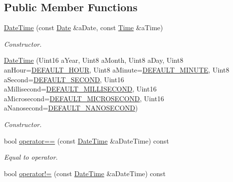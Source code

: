 \subsection*{Public Member Functions}
\begin{DoxyCompactItemize}
\item 
\hyperlink{classostk_1_1physics_1_1time_1_1_date_time_a974b5a7581ae7461ccf0e6ab85e42633}{Date\+Time} (const \hyperlink{classostk_1_1physics_1_1time_1_1_date}{Date} \&a\+Date, const \hyperlink{classostk_1_1physics_1_1time_1_1_time}{Time} \&a\+Time)
\begin{DoxyCompactList}\small\item\em Constructor. \end{DoxyCompactList}\item 
\hyperlink{classostk_1_1physics_1_1time_1_1_date_time_a85caea4e89f9d0436df65f1368f95738}{Date\+Time} (Uint16 a\+Year, Uint8 a\+Month, Uint8 a\+Day, Uint8 an\+Hour=\hyperlink{_date_time_8hpp_a29cf77aa34816fadd42d28e0076972d2}{D\+E\+F\+A\+U\+L\+T\+\_\+\+H\+O\+UR}, Uint8 a\+Minute=\hyperlink{_date_time_8hpp_a54870f99937ade8acd8a74e2162f6291}{D\+E\+F\+A\+U\+L\+T\+\_\+\+M\+I\+N\+U\+TE}, Uint8 a\+Second=\hyperlink{_date_time_8hpp_a6ac0fc9f50c93ddbea90f7ee16876c0a}{D\+E\+F\+A\+U\+L\+T\+\_\+\+S\+E\+C\+O\+ND}, Uint16 a\+Millisecond=\hyperlink{_date_time_8hpp_ac04ce019c94f46b059ce2c38a461b09c}{D\+E\+F\+A\+U\+L\+T\+\_\+\+M\+I\+L\+L\+I\+S\+E\+C\+O\+ND}, Uint16 a\+Microsecond=\hyperlink{_date_time_8hpp_ab098709ee4b926644c1c68216add901b}{D\+E\+F\+A\+U\+L\+T\+\_\+\+M\+I\+C\+R\+O\+S\+E\+C\+O\+ND}, Uint16 a\+Nanosecond=\hyperlink{_date_time_8hpp_a68609a8be8c5d286f17625e24a2e149a}{D\+E\+F\+A\+U\+L\+T\+\_\+\+N\+A\+N\+O\+S\+E\+C\+O\+ND})
\begin{DoxyCompactList}\small\item\em Constructor. \end{DoxyCompactList}\item 
bool \hyperlink{classostk_1_1physics_1_1time_1_1_date_time_a8ffda673aa698ebe33cd4c4d4a041ef6}{operator==} (const \hyperlink{classostk_1_1physics_1_1time_1_1_date_time}{Date\+Time} \&a\+Date\+Time) const
\begin{DoxyCompactList}\small\item\em Equal to operator. \end{DoxyCompactList}\item 
bool \hyperlink{classostk_1_1physics_1_1time_1_1_date_time_ae96358ed48be6bb4325d3f3408a8ab5c}{operator!=} (const \hyperlink{classostk_1_1physics_1_1time_1_1_date_time}{Date\+Time} \&a\+Date\+Time) const

\end{DoxyCompactItemize}
